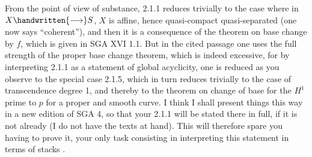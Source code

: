\reversemarginpar
{}
\normalmarginpar
{}

From the point of view of substance, 2.1.1 reduces trivially to the case where in $X\handwritten{\longrightarrow}S$, $X$ is affine, hence quasi-compact quasi-separated (one now says ``coherent''), and then it is a consequence of the theorem on base change by $f$, which is given in SGA  XVI 1.1. But in the cited passage one uses the full strength of the proper base change theorem, which is indeed excessive, for by interpreting 2.1.1 as a statement of global acyclicity, one is reduced as you observe  to the special case 2.1.5, which in turn reduces trivially to the case of transcendence degree 1, and thereby to the theorem\unsure{\handwritten{,}} on change of base for the $H^1$ prime to $p$ for a proper and smooth curve. I think I shall present things this way in a new edition of SGA 4, so that your 2.1.1 will be stated there in full, if it is not already (I do not have the texts at hand).
\reversemarginpar
{}
\normalmarginpar
This will therefore spare you having to prove it, your only task consisting in interpreting this statement in terms of stacks .

